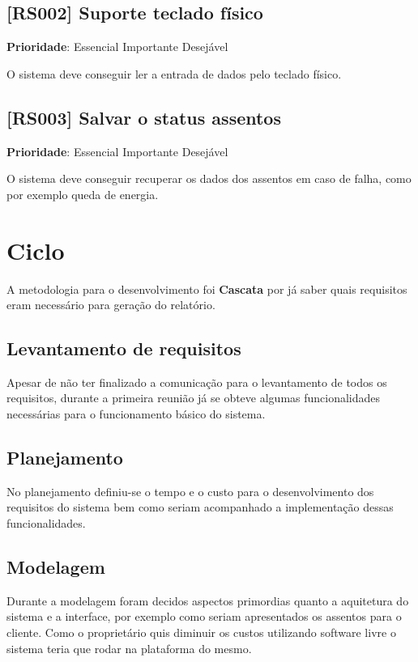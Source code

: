 \documentclass[12pt,a4paper]{article}
\let\oldsection\section
\renewcommand\section{\clearpage\oldsection}
\begin{document}
\subsection{[RS002] Suporte teclado físico}

\textbf{Prioridade}:
\mbox{\ooalign{$\checkmark$\cr\hidewidth$\square$\hidewidth\cr}} Essencial
\mbox{\ooalign{\cr\hidewidth$\square$\hidewidth\cr}} Importante
\mbox{\ooalign{\cr\hidewidth$\square$\hidewidth\cr}} Desejável

O sistema deve conseguir ler a entrada de dados pelo teclado físico.

\subsection{[RS003] Salvar o status assentos}

\textbf{Prioridade}:
\mbox{\ooalign{$\checkmark$\cr\hidewidth$\square$\hidewidth\cr}} Essencial
\mbox{\ooalign{\cr\hidewidth$\square$\hidewidth\cr}} Importante
\mbox{\ooalign{\cr\hidewidth$\square$\hidewidth\cr}} Desejável

O sistema deve conseguir recuperar os dados dos assentos em caso de falha, como
por exemplo queda de energia.

\section{Ciclo}

A metodologia para o desenvolvimento foi \textbf{Cascata} por já saber
quais requisitos eram necessário para geração do relatório.

\subsection{Levantamento de requisitos}
Apesar de não ter finalizado a comunicação para o levantamento de todos
os requisitos, durante a primeira reunião já se obteve algumas funcionalidades
necessárias para o funcionamento básico do sistema.

\subsection{Planejamento}
No planejamento definiu-se o tempo e o custo para o desenvolvimento dos
requisitos do sistema bem como seriam acompanhado a implementação dessas
funcionalidades.

\subsection{Modelagem}
Durante a modelagem foram decidos aspectos primordias quanto a aquitetura
do sistema e a interface, por exemplo como seriam apresentados os assentos
para o cliente. Como o proprietário quis diminuir os custos utilizando software
livre o sistema teria que rodar na plataforma do mesmo.
\end{document}
